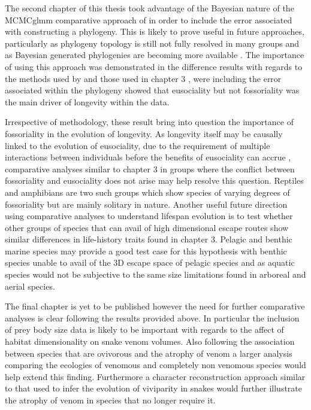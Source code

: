 The second chapter of this thesis took advantage of the Bayesian nature of the MCMCglmm comparative approach of \cite{hadfield2010mcmc} in order to include the error associated with constructing a phylogeny. This is likely to prove useful in future approaches, particularly as phylogeny topology is still not fully resolved in many groups \citep{jetz2012global,burleigh2015building,pyron2014early} and as Bayesian generated phylogenies are becoming more available \citep{arnold201010ktrees,jetz2012global}. The importance of using this approach was demonstrated in the difference results with regards to the methods used by \cite{williams2015ecology} and those used in chapter 3 \citep{healy2014ecology,healy2015eusociality}, were including the error associated within the phylogeny showed that eusociality but not fossoriality was the main driver of longevity within the data. 

Irrespective of methodology, these result bring into question the importance of fossoriality in the evolution of longevity. As longevity itself may be causally linked to the evolution of eusociality, due to the requirement of multiple interactions between individuals before the benefits of eusociality can accrue \citep{LukeM}, comparative analyses similar to chapter 3 in groups where the conflict between fossoriality and eusociality does not arise may help resolve this question. Reptiles and amphibians are two such groups which show species of varying degrees of fossoriality but are mainly solitary in nature. Another useful future direction using comparative analyses to understand lifespan evolution is to test whether other groups of species that can avail of high dimensional escape routes show similar differences in life-history traits found in chapter 3. Pelagic and benthic marine species may provide a good test case for this hypothesis with benthic species unable to avail of the 3D escape space of pelagic species and as aquatic species would not be subjective to the same size limitations found in arboreal and aerial species.

The final chapter is yet to be published however the need for further comparative analyses is clear following the results provided above. In particular the inclusion of prey body size data is likely to be important with regards to the affect of habitat dimensionality on snake venom volumes. Also following the association between species that are ovivorous and the atrophy of venom a larger analysis comparing the ecologies of venomous and completely non venomous species would help extend this finding.  Furthermore a character reconstruction approach similar to that used to infer the evolution of viviparity in snakes \citep{pyron2014early} would further illustrate the atrophy of venom in species that no longer require it. 


